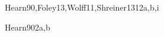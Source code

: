 \begin{syllabus}
\begin{unit}{\GVBasicRendering}{}{Hearn90,Foley13,Wolff11,Shreiner13}{12}{a,b,i}
   \begin{topics} 
        \item \GVBasicRenderingTopicRendering
        \item \GVBasicRenderingTopicForward 
        \item \GVBasicRenderingTopicBasic
        \item \GVBasicRenderingTopicAffine 
        \item \GVBasicRenderingTopicRay 
        \item \GVBasicRenderingTopicVisibility 
        \item \GVBasicRenderingTopicSimple 
        \item \GVBasicRenderingTopicRenderingWith 
        \item \GVBasicRenderingTopicApplication 
        \item \GVBasicRenderingTopicSampling 
        \item \GVBasicRenderingTopicForward 
   \end{topics}

   \begin{learningoutcomes} 
        \item \GVBasicRenderingLODiscussTheProblem [\Familiarity]
        \item \GVBasicRenderingLODescribeThePipeline [\Familiarity]
        \item \GVBasicRenderingLOCreateADisplay [\Usage]
        \item \GVBasicRenderingLOObtain [\Usage]
        \item \GVBasicRenderingLOApplyDimensional [\Usage]
        \item \GVBasicRenderingLOContrast [\Assessment]
        \item \GVBasicRenderingLOExplainTheApplications [\Familiarity]
        \item \GVBasicRenderingLOExplainTheRasterization [\Familiarity]
        \item \GVBasicRenderingLOImplementA [\Usage]
        \item \GVBasicRenderingLOComputeSpace [\Assessment]
        \item \GVBasicRenderingLOComputeTime [\Assessment]
   \end{learningoutcomes}
\end{unit}

\begin{unit}{\HCIProgrammingInteractiveSystems}{}{Hearn90}{2}{a,b}
    \begin{topics}
    	\item \HCIProgrammingInteractiveSystemsTopicEvent
    	\item \HCINewInteractiveTechnologiesTopicApproachesTo
    \end{topics}


\end{unit}
\end{syllabus}
